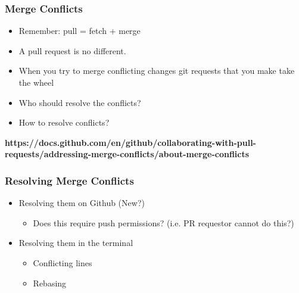 \documentclass{beamer}
\begin{document}
\begin{frame}[fragile]
	\frametitle{Merge Conflicts}
	\begin{itemize}
		\item Remember: pull = fetch + merge
		\item A pull request is no different.
		\item When you try to merge conflicting changes git requests that you make take the wheel
		\item Who should resolve the conflicts?
		\item How to resolve conflicts? 
	\end{itemize}

	\textbf{https://docs.github.com/en/github/collaborating-with-pull-requests/addressing-merge-conflicts/about-merge-conflicts}
\end{frame}

\begin{frame}[fragile]
	\frametitle{Resolving Merge Conflicts}
	\begin{itemize}
		\item Resolving them on Github (New?)
			\begin{itemize}
				\item Does this require push permissions? (i.e. PR requestor cannot do this?)
			\end{itemize}
		\item Resolving them in the terminal
			\begin{itemize}
				\item Conflicting lines
				\item Rebasing
			\end{itemize}
	\end{itemize}
\end{frame}
\note{
	\begin{itemize}
		\item 
	\end{itemize}
}
\end{document}
